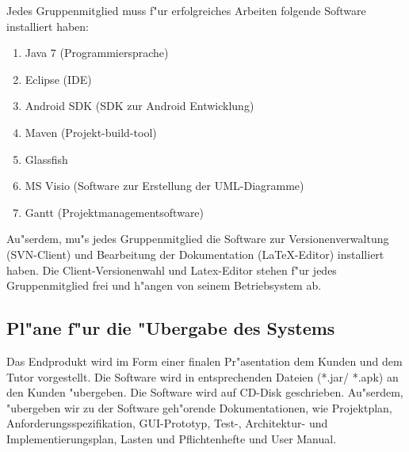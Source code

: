 Jedes Gruppenmitglied muss f"ur erfolgreiches Arbeiten folgende Software installiert haben:
\begin{enumerate}
 \item Java 7 (Programmiersprache)
 \item Eclipse (IDE)
 \item Android SDK (SDK zur Android Entwicklung)
 \item Maven (Projekt-build-tool)
 \item Glassfish 
 \item MS Visio (Software zur Erstellung der UML-Diagramme)
 \item Gantt (Projektmanagementsoftware)
\end{enumerate}
Au"serdem, mu"s jedes Gruppenmitglied die Software zur Versionenverwaltung (SVN-Client) und Bearbeitung der Dokumentation (LaTeX-Editor) installiert haben. Die Client-Versionenwahl und Latex-Editor stehen f"ur jedes Gruppenmitglied frei und h"angen von seinem Betriebsystem ab.

\subsection{Pl"ane f"ur die "Ubergabe des Systems}
Das Endprodukt wird im Form einer finalen Pr"asentation dem Kunden und dem Tutor vorgestellt.
Die Software wird in entsprechenden Dateien (*.jar/ *.apk) an den Kunden "ubergeben. Die Software wird auf CD-Disk geschrieben. Au"serdem, "ubergeben wir zu der Software geh"orende Dokumentationen, wie Projektplan, Anforderungsspezifikation, GUI-Prototyp, Test-, Architektur- und Implementierungsplan, Lasten und Pflichtenhefte und User Manual.


